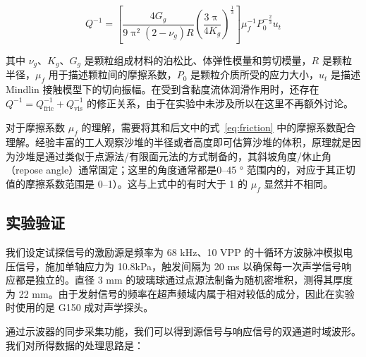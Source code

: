 \begin{equation}
  Q^{-1} = \left[\frac{4G_{g}}{9\uppi^2(2-\nu_{g})R}\left(\frac{3\uppi}{4K_{g}}\right)^{\frac{1}{3}}\right]\mu_{f}^{-1}P_{0}^{-\frac{2}{3}}u_{t}
\end{equation}

其中 $\nu_{g}$、$K_{g}$、$G_{g}$ 是颗粒组成材料的泊松比、体弹性模量和剪切模量，$R$ 是颗粒半径，$\mu_{f}$ 用于描述颗粒间的摩擦系数，$P_{0}$ 是颗粒介质所受的应力大小，$u_{t}$ 是描述 Mindlin 接触模型下的切向振幅。在受到含黏度流体润滑作用时，还存在 $Q^{-1} = Q_{\text{fric}}^{-1} + Q_{\text{vis}}^{-1}$ 的修正关系，由于在实验中未涉及所以在这里不再额外讨论。

对于摩擦系数 $\mu_{f}$ 的理解，需要将其和后文中的式~\eqref{eq:friction} 中的摩擦系数配合理解。经验丰富的工人观察沙堆的半径或者高度即可估算沙堆的体积，原理就是因为沙堆是通过类似于点源法/有限面元法的方式制备的，其斜坡角度/休止角（repose angle）通常固定；这里的角度通常都是\numrange{0}{45} \unit{\degree} 范围内的，对应于其正切值的摩擦系数范围是 \numrange{0}{1}）。这与上式中的有时大于 1 的 $\mu_{f}$ 显然并不相同。

\subsection{实验验证}

我们设定试探信号的激励源是频率为 68 \unit{\kilo\hertz}、10 \unit{VPP} 的十循环方波脉冲模拟电压信号，施加单轴应力为 10.8\unit{\kilo\pascal}，触发间隔为 20 \unit{\milli\second} 以确保每一次声学信号响应都是独立的。直径 3 \unit{\milli\meter} 的玻璃球通过点源法制备为随机密堆积，测得其厚度为 22 \unit{\milli\meter}。由于发射信号的频率在超声频域内属于相对较低的成分，因此在实验时使用的是 G150 成对声学探头。

通过示波器的同步采集功能，我们可以得到源信号与响应信号的双通道时域波形。我们对所得数据的处理思路是：

